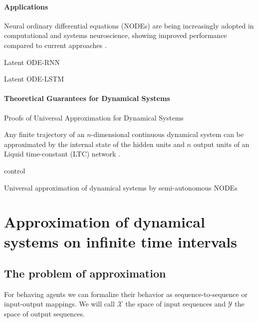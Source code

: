\documentclass{article}
\theoremstyle{definition}
\theoremstyle{remark}
\begin{document}
\paragraph{Applications}
Neural ordinary differential equations (NODEs) are being increasingly adopted in computational and systems neuroscience, showing improved performance compared to current approaches \citep{kim2021inferring,geenjaar2023learning,sedler2023expressive,elgazzar2024universal}.

Latent ODE-RNN\citep{rubanova2019latent}

Latent ODE-LSTM \citep{coelho2024enhancing}


\paragraph{Theoretical Guarantees for Dynamical Systems}
 Proofs of Universal Approximation for Dynamical Systems
 
 Any finite trajectory of an $n$-dimensional continuous dynamical system can be approximated by the internal state of the hidden units and $n$ output units of an Liquid time-constant (LTC) network \citep{hasani2018liquid}.
 
control \citep{tabuada2020universal}

\citep{zhang2020approximation}

\citep{li2022deep}

Universal approximation of dynamical systems by semi-autonomous NODEs \citep{li2024universal}








\section{Approximation of dynamical systems on infinite time intervals}

\subsection{The problem of approximation} %
For behaving agents we can formalize their behavior as sequence-to-sequence or input-output mappings.
We will call $\mathcal{X}$ the space of input sequences and $\mathcal{Y}$ the space of output sequences.
\end{document}
